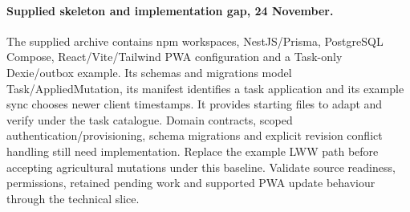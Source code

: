 \paragraph{Supplied skeleton and implementation gap, 24 November.}
The supplied archive contains npm workspaces, NestJS/Prisma, PostgreSQL Compose,
React/Vite/Tailwind PWA configuration and a Task-only Dexie/outbox example. Its
schemas and migrations model Task/AppliedMutation, its manifest identifies a task
application and its example sync chooses newer client timestamps. It provides
starting files to adapt and verify under the task catalogue. Domain contracts,
scoped authentication/provisioning, schema migrations and explicit revision conflict
handling still need implementation. Replace the example LWW path before accepting
agricultural mutations under this baseline. Validate source readiness, permissions,
retained pending work and supported PWA update behaviour through the technical slice.
